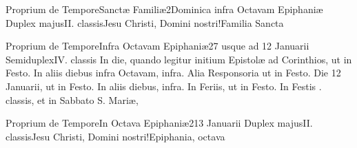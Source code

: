 \documentclass[liber-responsorialis_temporale.tex]{subfiles}
\begin{document}
	{Proprium de Tempore}{Sanctæ Familiæ}{2}{Dominica infra Octavam Epiphaniæ}
	{Duplex majus}{II. classis}{Jesu Christi, Domini nostri!Familia Sancta}
	{}
	{}
\pagebreak
{}
\pagebreak

	{Proprium de Tempore}{Infra Octavam Epiphaniæ}{2}{7 usque ad 12 Januarii}
	{Semiduplex}{IV. classis}{}
	{In die, quando legitur initium Epistolæ  ad Corinthios,  ut in Festo. 
	 In aliis diebus infra Octavam,  infra.
	 Alia Responsoria ut in Festo.
	}
	{Die 12 Januarii,  ut in Festo. In aliis diebus,  infra.
	 In Feriis,  ut in Festo. In Festis . classis, et in Sabbato S. Mariæ, 
	}

	{Proprium de Tempore}{In Octava Epiphaniæ}{2}{13 Januarii}
	{Duplex majus}{II. classis}{Jesu Christi, Domini nostri!Epiphania, octava}
	{}
	{}

\vspace{\baselineskip}

\end{document}
